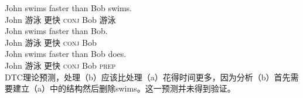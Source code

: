 %
\eal
\ex 
\gll John swims faster than Bob swims.\\
    John 游泳 更快 \textsc{conj} Bob 游泳\\
\ex 
\gll John swims faster than Bob.\\
    John 游泳 更快 \textsc{conj} Bob \\
\ex 
\gll John swims faster than Bob does.\\
    John 游泳 更快 \textsc{conj} Bob \textsc{prep}\\
\zl
DTC理论预测，处理（b）应该比处理（a）花得时间更多，因为分析（b）首先需要建立（a）中的结构然后删除swims。这一预测并未得到验证。

